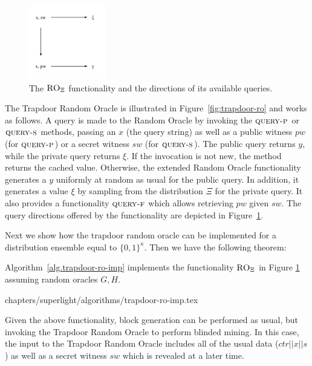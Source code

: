 \begin{figure}[h]
\begin{center}
  \includegraphics[width=0.30\textwidth]{chapters/superlight/figures/rox-commutative-diagram.pdf}
  \caption{The $\textsc{RO}_\Xi$ functionality and the directions of its available queries.}
  \label{fig:rox-commutativity-diagram}
  \end{center}
\end{figure}

The Trapdoor Random Oracle is illustrated in Figure~\ref{fig:trapdoor-ro} and
works as follows. A query is made to the Random Oracle by invoking the
$\textsc{query-p}$ or $\textsc{query-s}$ methods, passing an $x$
(the query string) as well as a public
witness $pw$ (for $\textsc{query-p}$) or a secret witness $sw$ (for $\textsc{query-s}$). The
public query returns $y$, while the private query returns $\xi$. If the
invocation is not new, the method returns the cached value. Otherwise, the
extended Random Oracle functionality generates a $y$ uniformly at random as
usual for the public query. In addition, it generates a value $\xi$ by sampling
from the distribution $\Xi$ for the private query. It also provides a
functionality $\textsc{query-f}$ which allows retrieving $pw$ given $sw$. The
query directions offered by the functionality are depicted in
Figure~\ref{fig:rox-commutativity-diagram}.

Next we show how the trapdoor random oracle can be implemented
for a distribution ensemble equal to $\{0,1\}^\kappa$.
Then we have the following theorem:

\begin{theorem}
 Algorithm~\ref{alg.trapdoor-ro-imp} implements the functionality
 $\textsc{RO}_\Xi$ in Figure
  \ref{fig:rox-commutativity-diagram} assuming random oracles $G,H$.
\end{theorem}

{chapters/superlight/algorithms/trapdoor-ro-imp.tex}

Given the above functionality, block generation can be performed as usual, but
invoking the Trapdoor Random Oracle to perform blinded mining. In this case, the
input to the Trapdoor Random Oracle includes all of the usual data
($ctr || x || s$) as well as a secret witness $sw$ which is revealed at a later
time.

